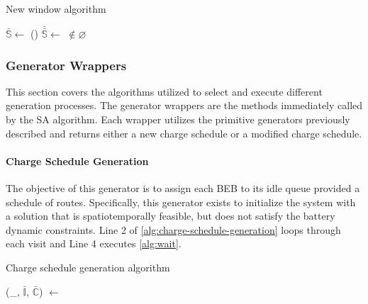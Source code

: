 \documentclass[11pt,a4paper,final]{article}
\newcommand{\I}{\mathbb{I}}                 %
\newcommand{\C}{\mathbb{C}}                 %
\newcommand{\Sol}{\mathbb{S}}               %
\begin{document}
\begin{algorithm}[H]
  \caption{New window algorithm} \label{alg:new-window}
  \LinesNumbered
  \KwIn{$\Sol$}
  \KwOut{$\bar{\Sol}$}


  \Begin
  {
    $\bar{\Sol} \leftarrow$\Purge{$\Sol$}
    \If()
       {
         $\bar{\bar{\Sol}} \leftarrow$ \NewVisit{$\bar{\Sol}$} $\not\in \varnothing$
       }
       {
         \Return{$\bar{\bar{\Sol}}$} 
       }

       \Return{($\varnothing$)}
  }
\end{algorithm}

\subsubsection{Generator Wrappers}
\label{sec:generator-wrappers}
This section covers the algorithms utilized to select and execute different generation processes. The generator wrappers
are the methods immediately called by the SA algorithm. Each wrapper utilizes the primitive generators previously
described and returns either a new charge schedule or a modified charge schedule.

\paragraph{Charge Schedule Generation}
\label{sec:charge-schedule-generation}
The objective of this generator is to assign each BEB to its idle queue provided a schedule of routes. Specifically,
this generator exists to initialize the system with a solution that is spatiotemporally feasible, but does not satisfy
the battery dynamic constraints. Line 2 of \ref{alg:charge-schedule-generation} loops through each visit and Line 4
executes \ref{alg:wait}.

\begin{algorithm}[H]
\caption{Charge schedule generation algorithm} \label{alg:charge-schedule-generation}
    \LinesNumbered
    \KwIn{$\I$, $\C$}
    \KwOut{$\bar{\I}$, $\bar{\C}$}


    \Begin
    {
        \ForEach {$\I_i \in \I$}
        {
            (\_, $\bar{\I}$, $\bar{\C}$) $\leftarrow$ \Wait{($\I_i$, $\I$, $\C$)}
        }
            \Return{($\bar{\I}$, $\bar{\C}$)}
    }
  \end{algorithm}
\end{document}
